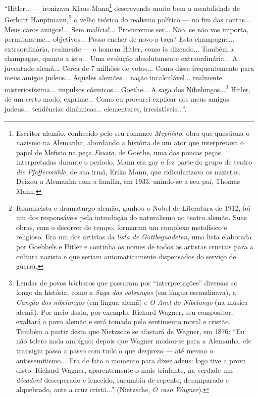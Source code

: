 ``Hitler... --- ironizava Klaus Mann\footnote{Escritor alemão, conhecido pelo seu romance \emph{Mephisto}, obra que
  questiona o nazismo na Alemanha, abordando a história de um ator que
  interpretava o papel de Mefisto na peça \emph{Fausto}, de Goethe, uma
  das poucas peças interpretadas durante o período. Mann era gay e fez
  parte do grupo de teatro \emph{die Pfeffermühle}, de sua irmã, Erika
  Mann, que ridicularizava os nazistas. Deixou a Alemanha com a família,
  em 1933, unindo-se a seu pai, Thomas Mann.} descrevendo muito bem a mentalidade de Gerhart
Hauptmann,\footnote{Romancista e dramaturgo alemão, ganhou o Nobel de Literatura de 1912,
  foi um dos responsáveis pela introdução do naturalismo no teatro
  alemão. Suas obras, com o decorrer do tempo, formaram um complexo
  metafísico e religioso. Era um dos artistas da \emph{lista de
  Gottbegnadeten}, uma lista elaborada por Goebbels e Hitler e continha
  os nomes de todos os artistas cruciais para a cultura nazista e que
  seriam automaticamente dispensados do serviço de guerra.} o velho teórico do realismo político --- no fim das
contas... Meus caros amigos!... Sem malícia!... Procuremos ser... Não,
se não vos importa, permitam-me... objetivos... Posso encher de novo a
taça? Esta champagne... extraordinária, realmente --- o homem Hitler,
como ia dizendo... Também a champagne, quanto a isto... Uma evolução
absolutamente extraordinária... A juventude alemã... Cerca de 7 milhões
de votos... Como disse frequentemente para meus amigos judeus... Aqueles
alemães... nação incalculável... realmente misteriosíssima... impulsos
cósmicos... Goethe... A saga dos Nibelungos...\footnote{Lendas de povos bárbaros que
  passaram por ``interpretações'' diversas ao longo da história, como a
  \emph{Saga dos volsungos} (em língua escandinava), a \emph{Canção dos
  nibelungos} (em língua alemã) e \emph{O Anel do Nibelungo} (na música
  alemã). Por meio desta, por exemplo, Richard Wagner, seu compositor,
  exaltará o povo alemão e será tomado pelo sentimento moral e cristão.
  Também a partir desta que Nietzsche se afastará de Wagner, em 1876:
  ``Eu não tolero nada ambíguo; depois que Wagner mudou-se para a
  Alemanha, ele transigiu passo a passo com tudo o que desprezo --- até
  mesmo o antissemitismo... Era de fato o momento para dizer adeus: logo
  tive a prova disto. Richard Wagner, aparentemente o mais triufante, na
  verdade um \emph{décadent} desesperado e fenecido, sucumbiu de
  repente, desamparado e alquebrado, ante a cruz cristã...'' (Nietzsche,
  \emph{O caso Wagner}).} Hitler, de um certo modo, exprime... Como eu procurei
explicar aos meus amigos judeus... tendências dinâmicas... elementares,
irresistíveis...''.

